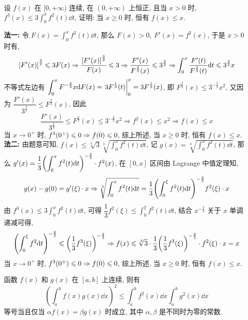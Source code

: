 \begin{example}
    设 $f(x)$ 在 $[0,+\infty)$ 连续, 在 $(0,+\infty)$ 上恒正, 且当 $x>0$ 时, $\displaystyle f^3(x)\leqslant 3\int_{0}^{x}f^2(t)\dd t$, 证明: 当 $x\geqslant 0$ 时, 恒有 $f(x)\leqslant x.$
\end{example}
\begin{solution}
    \textbf{法一: }令 $F(x)=\displaystyle\int_{0}^{x}f^2(t)\dd t$, 那么 $F(x)>0,~F'(x)=f^2(x)$, 于是 $x>0$ 时有,
    $$\qty[F'(x)]^{\frac{3}{2}}\leqslant 3F(x)\Rightarrow \dfrac{\qty[F'(x)]^{\frac{3}{2}}}{F(x)}\leqslant 3\Rightarrow \dfrac{F'(x)}{F^{\frac{2}{3}}(x)}\leqslant 3^{\frac{2}{3}}\Rightarrow \int_{0}^{x}\dfrac{F'(t)}{F^{\frac{2}{3}}(t)}\dd t\leqslant 3^{\frac{2}{3}}x$$
    不等式左边有 $\displaystyle\int_{0}^{x}F^{-\frac{2}{3}}x\dd F(x)=\eval{3F^{\frac{1}{3}}(t)}_{0}^{x}=3F^{\frac{1}{3}}(x)$, 即 $F^{\frac{2}{3}}(x)\leqslant 3^{-\frac{2}{3}}x^2$, 又因为 $\dfrac{F'(x)}{3^{\frac{2}{3}}}\leqslant F^{\frac{2}{3}}(x)$, 因此
    $$\dfrac{F'(x)}{3^{\frac{2}{3}}}\leqslant F^{\frac{2}{3}}(x)\leqslant 3^{-\frac{2}{3}}x^2\Rightarrow f^2(x)\leqslant x^2\Rightarrow f(x)\leqslant x$$
    当 $x\to0^+$ 时, $f^3\qty(0^+)\leqslant 0\Rightarrow f(0)\leqslant 0$, 综上所述, 当 $x\geqslant 0$ 时, 恒有 $f(x)\leqslant x.$\\
    \textbf{法二: }由题意可知, $f(x)\leqslant \sqrt[3]{3}\sqrt[3]{\displaystyle\int_{0}^{x}f^2(t)\dd t}$, 记 $g(x)=\sqrt[3]{\displaystyle\int_{0}^{x}f^2(t)\dd t}$, 那么 $g'(x)=\dfrac{1}{3}\qty(\displaystyle\int_{0}^{x}f^2(t)\dd t)^{-\frac{2}{3}}\cdot f^2(x)$, 在 $[0,x]$ 区间由 Lagrange 中值定理知,
    $$g(x)-g(0)=g'(\xi)\cdot x\Rightarrow \sqrt[3]{\displaystyle\int_{0}^{x}f^2(t)\dd t}=\dfrac{1}{3}\qty(\displaystyle\int_{0}^{\xi}f^2(t)\dd t)^{-\frac{2}{3}}f^2(\xi)\cdot x$$
    由 $f^3(x)\leqslant 3\displaystyle\int_{0}^{x}f^2(t)\dd t$, 可得 $\dfrac{1}{3}f^2(\xi)\leqslant \displaystyle \int_{0}^{\xi}f^2(t)\dd t$, 结合 $x^{-\frac{2}{3}}$ 关于 $x$ 单调递减可得,
    $$\qty(\int_{0}^{\xi}f^2\dd t)^{-\frac{2}{3}}\leqslant \qty(\dfrac{1}{3}f^3(\xi))^{-\frac{2}{3}}\Rightarrow f(x)\leqslant \sqrt[3]{3}\cdot\dfrac{1}{3}\qty(\dfrac{1}{3}f^3(\xi))^{-\frac{2}{3}}\cdot f^2(\xi)\cdot x=x$$
    当 $x\to0^+$ 时, $f^3\qty(0^+)\leqslant 0\Rightarrow f(0)\leqslant 0$, 综上所述, 当 $x\geqslant 0$ 时, 恒有 $f(x)\leqslant x.$
\end{solution}

\begin{theorem}
    函数 $f(x)$ 和 $g(x)$ 在 $[a,b]$ 上连续, 则有
    $$\left(\int_{a}^{b}f(x)g(x)\dd x\right)^2\leqslant \int_{a}^{b}f^2(x)\dd x\int_{a}^{b}g^2(x)\dd x$$
    等号当且仅当 $\alpha f(x)=\beta g(x)$ 时成立, 其中 $\alpha,\beta$ 是不同时为零的常数.
\end{theorem}

